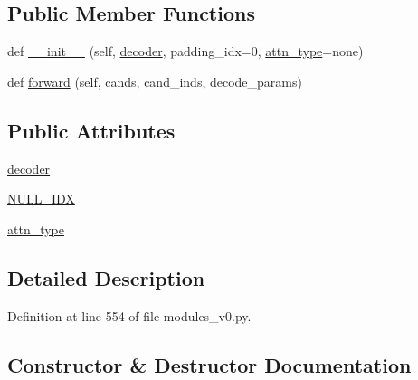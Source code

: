 \subsection*{Public Member Functions}
\begin{DoxyCompactItemize}
\item 
def \hyperlink{classparlai_1_1agents_1_1legacy__agents_1_1seq2seq_1_1modules__v0_1_1Ranker_a79693c86fc7bebea2b197e1c168ec002}{\+\_\+\+\_\+init\+\_\+\+\_\+} (self, \hyperlink{classparlai_1_1agents_1_1legacy__agents_1_1seq2seq_1_1modules__v0_1_1Ranker_a5500f3bd094b3a3b19c992cbc1d42918}{decoder}, padding\+\_\+idx=0, \hyperlink{classparlai_1_1agents_1_1legacy__agents_1_1seq2seq_1_1modules__v0_1_1Ranker_a17f285352bdb89eea215c874a38bee02}{attn\+\_\+type}=\textquotesingle{}none\textquotesingle{})
\item 
def \hyperlink{classparlai_1_1agents_1_1legacy__agents_1_1seq2seq_1_1modules__v0_1_1Ranker_a48177b131d765ebd734d25f962c44f55}{forward} (self, cands, cand\+\_\+inds, decode\+\_\+params)
\end{DoxyCompactItemize}
\subsection*{Public Attributes}
\begin{DoxyCompactItemize}
\item 
\hyperlink{classparlai_1_1agents_1_1legacy__agents_1_1seq2seq_1_1modules__v0_1_1Ranker_a5500f3bd094b3a3b19c992cbc1d42918}{decoder}
\item 
\hyperlink{classparlai_1_1agents_1_1legacy__agents_1_1seq2seq_1_1modules__v0_1_1Ranker_a17d8139e8d7e9952f0f17e8884710744}{N\+U\+L\+L\+\_\+\+I\+DX}
\item 
\hyperlink{classparlai_1_1agents_1_1legacy__agents_1_1seq2seq_1_1modules__v0_1_1Ranker_a17f285352bdb89eea215c874a38bee02}{attn\+\_\+type}
\end{DoxyCompactItemize}


\subsection{Detailed Description}


Definition at line 554 of file modules\+\_\+v0.\+py.



\subsection{Constructor \& Destructor Documentation}
\mbox{\label{classparlai_1_1agents_1_1legacy__agents_1_1seq2seq_1_1modules__v0_1_1Ranker_a79693c86fc7bebea2b197e1c168ec002}} 
